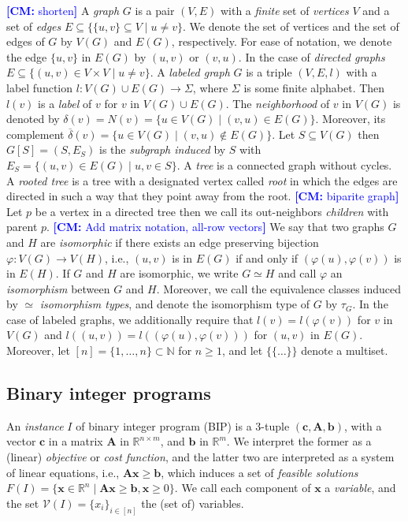 \documentclass[11pt, DIV=12]{scrartcl}
\theoremstyle{definition}
\newcommand{\new}[1]{\emph{#1}}
\newcommand{\cV}{\ensuremath{{\mathcal V}}\xspace}
\newcommand{\RR}{\mathbb{R}}
\newcommand{\NN}{\mathbb{N}}
\newcommand{\ndelta}{\ensuremath{\overline{\delta}}}
\renewcommand{\vec}[1]{\mathbf{#1}}
\newcommand{\cm}[1]{{{\textcolor{blue}{\textbf{[CM:} {#1}\textbf{]}}}}}
\begin{document}
\cm{shorten}
A \new{graph} $G$ is a pair $(V,E)$ with a \emph{finite} set of
\new{vertices} $V$ and a set of \new{edges} $E \subseteq \{ \{u,v\}
\subseteq V \mid u \neq v \}$. We denote the set of vertices and the set
of edges of $G$ by $V(G)$ and $E(G)$, respectively. For ease of
notation, we denote the edge $\{u,v\}$ in $E(G)$ by $(u,v)$ or
$(v,u)$. In the case of \emph{directed graphs} $E \subseteq \{ (u,v)
\in V \times V \mid u \neq v \}$. A \new{labeled graph} $G$ is a triple
$(V,E,l)$ with a label function $l \colon V(G) \cup E(G) \to \Sigma$,
where $\Sigma$ is some finite alphabet. Then $l(v)$ is a
\new{label} of $v$ for $v$ in $V(G) \cup E(G)$. 
The \new{neighborhood} 
of $v$ in $V(G)$ is denoted by $\delta(v) = N(v) = \{ u \in V(G) \mid (v, u) \in E(G) \}$. 
Moreover, its complement $\ndelta(v) = \{ u \in V(G) \mid (v, u) \notin E(G) \}$. 
Let $S \subseteq
V(G)$ then $G[S] = (S,E_S)$ is the \new{subgraph induced} by $S$ with
$E_S = \{ (u,v) \in E(G) \mid u,v \in S \}$. A \new{tree} is a connected graph without
cycles. A \new{rooted tree} is a tree with a designated vertex called \new{root} in which the edges are directed in such a way that they point away from the root. \cm{biparite graph}
Let $p$ be a vertex in a directed tree then we call its out-neighbors \new{children} with parent $p$. 
\cm{Add matrix notation, all-row vectors}
We say that two graphs $G$ and $H$
are \new{isomorphic} if there exists an edge preserving bijection
$\varphi \colon V(G) \to V(H)$, i.e., $(u,v)$ is in $E(G)$ if and only if
$(\varphi(u),\varphi(v))$ is in $E(H)$. If $G$ and $H$ are isomorphic,
we write $G \simeq H$ and call $\varphi$ an \new{isomorphism} between
$G$ and $H$. Moreover, we call the equivalence classes induced by
$\simeq$ \emph{isomorphism types}, and denote the isomorphism type of $G$ by
$\tau_G$. In the case of labeled graphs, we additionally require that
$l(v) = l(\varphi(v))$ for $v$ in $V(G)$ and $l((u,v)) = l((\varphi(u), \varphi(v)))$ for $(u,v)$ in $E(G)$. 
Moreover, let $[n] = \{ 1, \dotsc, n \} \subset \NN$ for $n \geq 1$, and let $\{\!\!\{ \dots\}\!\!\}$ denote a multiset. 


\subsection{Binary integer programs}\label{bip}

An \emph{instance} $I$ of binary integer program (BIP) is a $3$-tuple $(\vec{c}, \vec{A}, \vec{b})$, with a vector $\vec{c}$ in a matrix $\vec{A}$ in $\RR^{n \times m}$, and $\vec{b}$ in $\RR^{m}$. We interpret the former as a (linear) \new{objective} or \new{cost function}, and the latter two  are interpreted as a system of linear equations, i.e., $\vec{A} \vec{x} \geq \vec{b}$, which induces a set of \emph{feasible solutions} $F(I) = \{ \vec{x} \in \RR^n \mid \vec{A} \vec{x} \geq \vec{b}, \vec{x} \geq 0 \}$. We call each component of $\vec{x}$ a \new{variable}, and the set $\cV(I) = \{x_i \}_{i \in [n]}$ the (set of) variables.
\end{document}
